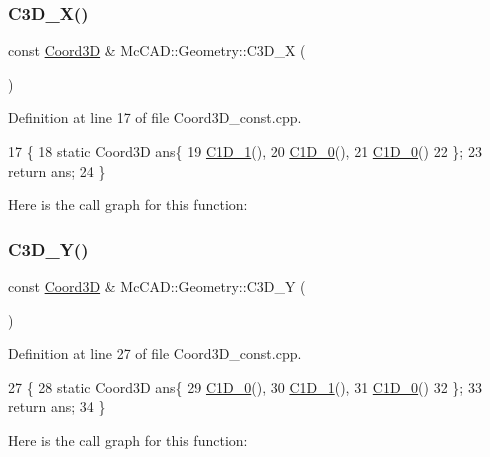 \subsubsection{\texorpdfstring{C3\+D\+\_\+\+X()}{C3D\_X()}}
{\footnotesize\ttfamily const \hyperlink{classMcCAD_1_1Geometry_1_1Coord3D}{Coord3D} \& Mc\+C\+A\+D\+::\+Geometry\+::\+C3\+D\+\_\+X (\begin{DoxyParamCaption}{ }\end{DoxyParamCaption})}



Definition at line 17 of file Coord3\+D\+\_\+const.\+cpp.


\begin{DoxyCode}
17                     \{
18     \textcolor{keyword}{static} Coord3D ans\{
19         \hyperlink{namespaceMcCAD_1_1Geometry_ad7994c2ae088570476d26d338aa22cff}{C1D\_1}(),
20         \hyperlink{namespaceMcCAD_1_1Geometry_aef0aab16ba6382b032e4e3a8a5d37b94}{C1D\_0}(),
21         \hyperlink{namespaceMcCAD_1_1Geometry_aef0aab16ba6382b032e4e3a8a5d37b94}{C1D\_0}()
22     \};
23     \textcolor{keywordflow}{return} ans;
24 \}
\end{DoxyCode}
Here is the call graph for this function\+:
\mbox{\label{namespaceMcCAD_1_1Geometry_a105e7dca9e9dc438103f086675d987af}} 
\subsubsection{\texorpdfstring{C3\+D\+\_\+\+Y()}{C3D\_Y()}}
{\footnotesize\ttfamily const \hyperlink{classMcCAD_1_1Geometry_1_1Coord3D}{Coord3D} \& Mc\+C\+A\+D\+::\+Geometry\+::\+C3\+D\+\_\+Y (\begin{DoxyParamCaption}{ }\end{DoxyParamCaption})}



Definition at line 27 of file Coord3\+D\+\_\+const.\+cpp.


\begin{DoxyCode}
27                     \{
28     \textcolor{keyword}{static} Coord3D ans\{
29         \hyperlink{namespaceMcCAD_1_1Geometry_aef0aab16ba6382b032e4e3a8a5d37b94}{C1D\_0}(),
30         \hyperlink{namespaceMcCAD_1_1Geometry_ad7994c2ae088570476d26d338aa22cff}{C1D\_1}(),
31         \hyperlink{namespaceMcCAD_1_1Geometry_aef0aab16ba6382b032e4e3a8a5d37b94}{C1D\_0}()
32     \};
33     \textcolor{keywordflow}{return} ans;
34 \}
\end{DoxyCode}
Here is the call graph for this function\+:
\mbox{\label{namespaceMcCAD_1_1Geometry_a6995a84d409796aa67e06a115cdc5803}} 
